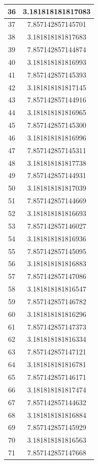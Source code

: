 \documentclass[12pt,a4paper,UTF8]{ctexart}
\begin{document}
\begin{enumerate}
\begin{longtable}{c|c}
36 & 3.181818181817083  \\ \hline
37 & 7.857142857145701  \\ \hline
38 & 3.181818181817683  \\ \hline
39 & 7.857142857144874  \\ \hline
40 & 3.181818181816993  \\ \hline
41 & 7.857142857145393  \\ \hline
42 & 3.181818181817145  \\ \hline
43 & 7.857142857144916  \\ \hline
44 & 3.181818181816965  \\ \hline
45 & 7.857142857145300  \\ \hline
46 & 3.181818181816996  \\ \hline
47 & 7.857142857145311  \\ \hline
48 & 3.181818181817738  \\ \hline
49 & 7.857142857144931  \\ \hline
50 & 3.181818181817039  \\ \hline
51 & 7.857142857144669  \\ \hline
52 & 3.181818181816693  \\ \hline
53 & 7.857142857146027  \\ \hline
54 & 3.181818181816936  \\ \hline
55 & 7.857142857145095  \\ \hline
56 & 3.181818181816883  \\ \hline
57 & 7.857142857147086  \\ \hline
58 & 3.181818181816547  \\ \hline
59 & 7.857142857146782  \\ \hline
60 & 3.181818181816296  \\ \hline
61 & 7.857142857147373  \\ \hline
62 & 3.181818181816334  \\ \hline
63 & 7.857142857147121  \\ \hline
64 & 3.181818181816781  \\ \hline
65 & 7.857142857146171  \\ \hline
66 & 3.181818181817474  \\ \hline
67 & 7.857142857144632  \\ \hline
68 & 3.181818181816884  \\ \hline
69 & 7.857142857145929  \\ \hline
70 & 3.181818181816563  \\ \hline
71 & 7.857142857147668  \\ \hline

\end{longtable}
\end{enumerate}
\end{document}
